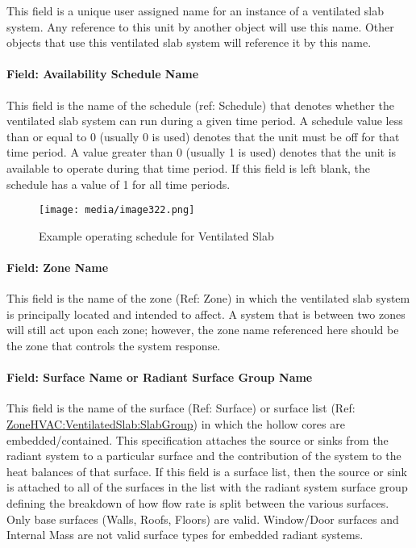 This field is a unique user assigned name for an instance of a ventilated slab system. Any reference to this unit by another object will use this name. Other objects that use this ventilated slab system will reference it by this name.

\paragraph{Field: Availability Schedule Name}\label{field-availability-schedule-name-9-001}

This field is the name of the schedule (ref: Schedule) that denotes whether the ventilated slab system can run during a given time period. A schedule value less than or equal to 0 (usually 0 is used) denotes that the unit must be off for that time period. A value greater than 0 (usually 1 is used) denotes that the unit is available to operate during that time period. If this field is left blank, the schedule has a value of 1 for all time periods.

\begin{figure}[hbtp] %
\centering
\texttt{[image: media/image322.png]}
\caption{Example operating schedule for Ventilated Slab \protect \label{fig:example-operating-schedule-for-ventilated}}
\end{figure}

\paragraph{Field: Zone Name}\label{field-zone-name-4-004}

This field is the name of the zone (Ref: Zone) in which the ventilated slab system is principally located and intended to affect. A system that is between two zones will still act upon each zone; however, the zone name referenced here should be the zone that controls the system response.

\paragraph{Field: Surface Name or Radiant Surface Group Name}\label{field-surface-name-or-radiant-surface-group-name-3}

This field is the name of the surface (Ref: Surface) or surface list (Ref: \hyperref[zonehvacventilatedslabslabgroup]{ZoneHVAC:VentilatedSlab:SlabGroup}) in which the hollow cores are embedded/contained. This specification attaches the source or sinks from the radiant system to a particular surface and the contribution of the system to the heat balances of that surface. If this field is a surface list, then the source or sink is attached to all of the surfaces in the list with the radiant system surface group defining the breakdown of how flow rate is split between the various surfaces. Only base surfaces (Walls, Roofs, Floors) are valid. Window/Door surfaces and Internal Mass are not valid surface types for embedded radiant systems.

